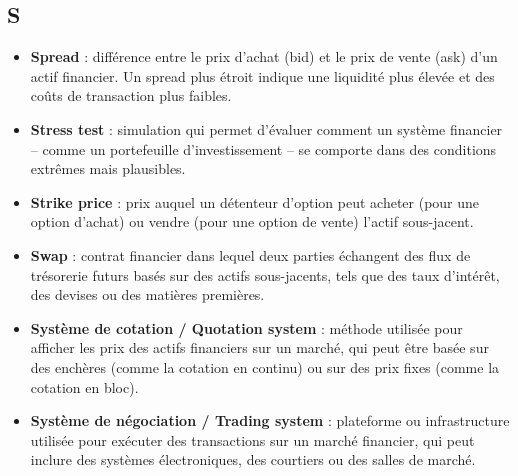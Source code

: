 \documentclass[a4paper,10pt]{article}
\begin{document}
\begin{multicols}{2}
\section*{S}
\begin{itemize}
  \item \textbf{Spread} : différence entre le prix d’achat (bid) et le prix de vente (ask) d’un actif financier. Un spread plus étroit indique une liquidité plus élevée et des coûts de transaction plus faibles.
  \item \textbf{Stress test} : simulation qui permet d'évaluer comment un système financier -- comme un portefeuille d'investissement -- se comporte dans des conditions extrêmes mais plausibles.
  \item \textbf{Strike price} : prix auquel un détenteur d’option peut acheter (pour une option d’achat) ou vendre (pour une option de vente) l’actif sous-jacent.
  \item \textbf{Swap} : contrat financier dans lequel deux parties échangent des flux de trésorerie futurs basés sur des actifs sous-jacents, tels que des taux d’intérêt, des devises ou des matières premières.
  \item \textbf{Système de cotation / Quotation system} : méthode utilisée pour afficher les prix des actifs financiers sur un marché, qui peut être basée sur des enchères (comme la cotation en continu) ou sur des prix fixes (comme la cotation en bloc).
  \item \textbf{Système de négociation / Trading system} : plateforme ou infrastructure utilisée pour exécuter des transactions sur un marché financier, qui peut inclure des systèmes électroniques, des courtiers ou des salles de marché.
\end{itemize}


\end{multicols}
\end{document}
